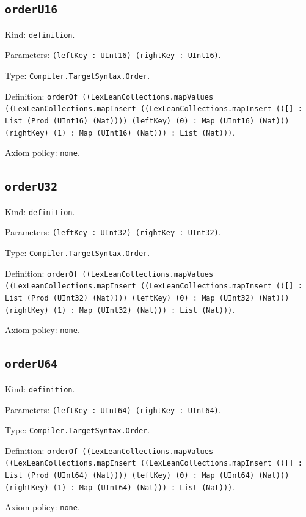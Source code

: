 \documentclass[11pt]{article}
\begin{document}
\subsection*{\texttt{orderU16}}
\noindent Kind: \texttt{definition}.\par
\noindent Parameters: \texttt{(leftKey : UInt16) (rightKey : UInt16)}.\par
\noindent Type: \texttt{Compiler.TargetSyntax.Order}.\par
\noindent Definition: \texttt{orderOf ((LexLeanCollections.mapValues ((LexLeanCollections.mapInsert ((LexLeanCollections.mapInsert (([] : List (Prod (UInt16) (Nat)))) (leftKey) (0) : Map (UInt16) (Nat))) (rightKey) (1) : Map (UInt16) (Nat))) : List (Nat)))}.\par
\noindent Axiom policy: \texttt{none}.\par
\subsection*{\texttt{orderU32}}
\noindent Kind: \texttt{definition}.\par
\noindent Parameters: \texttt{(leftKey : UInt32) (rightKey : UInt32)}.\par
\noindent Type: \texttt{Compiler.TargetSyntax.Order}.\par
\noindent Definition: \texttt{orderOf ((LexLeanCollections.mapValues ((LexLeanCollections.mapInsert ((LexLeanCollections.mapInsert (([] : List (Prod (UInt32) (Nat)))) (leftKey) (0) : Map (UInt32) (Nat))) (rightKey) (1) : Map (UInt32) (Nat))) : List (Nat)))}.\par
\noindent Axiom policy: \texttt{none}.\par
\subsection*{\texttt{orderU64}}
\noindent Kind: \texttt{definition}.\par
\noindent Parameters: \texttt{(leftKey : UInt64) (rightKey : UInt64)}.\par
\noindent Type: \texttt{Compiler.TargetSyntax.Order}.\par
\noindent Definition: \texttt{orderOf ((LexLeanCollections.mapValues ((LexLeanCollections.mapInsert ((LexLeanCollections.mapInsert (([] : List (Prod (UInt64) (Nat)))) (leftKey) (0) : Map (UInt64) (Nat))) (rightKey) (1) : Map (UInt64) (Nat))) : List (Nat)))}.\par
\noindent Axiom policy: \texttt{none}.\par
\end{document}
